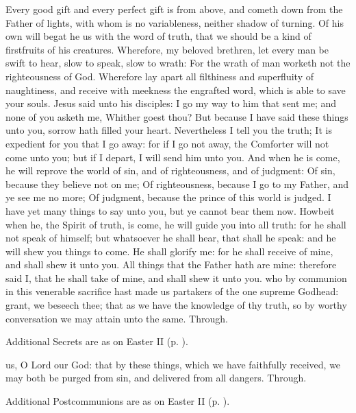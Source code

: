  Every good gift and every perfect gift is from above, and cometh down from the Father of lights, with whom is no variableness, neither shadow of turning. Of his own will begat he us with the word of truth, that we should be a kind of firstfruits of his creatures. Wherefore, my beloved brethren, let every man be swift to hear, slow to speak, slow to wrath: For the wrath of man worketh not the righteousness of God. Wherefore lay apart all filthiness and superfluity of naughtiness, and receive with meekness the engrafted word, which is able to save your souls.
 Jesus said unto his disciples: I go my way to him that sent me; and none of you asketh me, Whither goest thou? But because I have said these things unto you, sorrow hath filled your heart. Nevertheless I tell you the truth; It is expedient for you that I go away: for if I go not away, the Comforter will not come unto you; but if I depart, I will send him unto you. And when he is come, he will reprove the world of sin, and of righteousness, and of judgment: Of sin, because they believe not on me; Of righteousness, because I go to my Father, and ye see me no more; Of judgment, because the prince of this world is judged. I have yet many things to say unto you, but ye cannot bear them now. Howbeit when he, the Spirit of truth, is come, he will guide you into all truth: for he shall not speak of himself; but whatsoever he shall hear, that shall he speak: and he will shew you things to come. He shall glorify me: for he shall receive of mine, and shall shew it unto you. All things that the Father hath are mine: therefore said I, that he shall take of mine, and shall shew it unto you.
\secret
{} who by communion in this venerable sacrifice hast made us partakers of the one supreme Godhead: grant, we beseech thee; that as we have the knowledge of thy truth, so by worthy conversation we may attain unto the same. Through.
\begin{rubric}
    Additional Secrets are as on Easter II (p. \pageref{EasterII}).
\end{rubric}
\postcommunion
{} us, O Lord our God: that by these things, which we have faithfully received, we may both be purged from sin, and delivered from all dangers. Through.
\begin{rubric}
    Additional Postcommunions are as on Easter II (p. \pageref{EasterII}).
\end{rubric}

